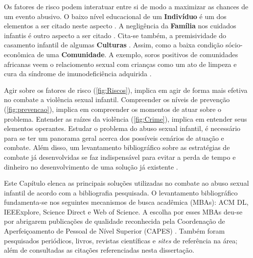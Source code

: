 Os fatores de risco podem interatuar entre si de modo a maximizar as chances de um evento abusivo. O baixo nível educacional de um \textbf{Indivíduo} é um dos elementos a ser citado neste aspecto \cite{dahlberg2006violencia}. A negligência da \textbf{Família} nos cuidados infantis é outro aspecto a ser citado \cite{blasco2018abuso}. Cita-se também, a premisividade do casamento infantil de algumas \textbf{Culturas} \cite{bandiera2017women}. Assim, como a baixa condição sócio-econômica de uma \textbf{Comunidade}. A exemplo, soros positivos de comunidades africanas veem o relaciomento sexual com crianças como um ato de limpeza e cura da síndrome de imunodeficiência adquirida \cite{aded2006abuso}.



Agir sobre os fatores de risco (\autoref{fig:Riscos}), implica em agir de forma mais efetiva no combate a violência sexual infantil. Compreender os níveis de prevenção (\autoref{fig:prevencao}), implica em compreender os momentos de atuar sobre o problema. Entender as raízes da violência (\autoref{fig:Crime}), implica em entender seus elementos operantes. Estudar o problema do abuso sexual infantil, é necessário para se ter um panorama geral acerca dos possíveis cenários de atuação e combate. Além disso, um levantamento bibliográfico sobre as estratégias de combate já desenvolvidas se faz indispensável para evitar a perda de tempo e dinheiro no desenvolvimento de uma solução já existente \cite{wazlawick2014metodologia}. 

Este Capítulo elenca as principais soluções utilizadas no combate ao abuso sexual infantil de acordo com a bibliografia pesquisada. O levantamento bibliográfico fundamenta-se nos seguintes mecanismos de busca acadêmica (MBAs): ACM DL, IEEExplore, Science Direct e Web of Science. A escolha por esses MBAs deu-se por abrigarem publicações de qualidade reconhecida pela Coordenação de Aperfeiçoamento de Pessoal de Nível Superior (CAPES) \cite{capes2016}%
. Também foram pesquisados periódicos, livros, revistas científicas e \textit{sites} de referência na área; além de consultadas as citações referenciadas nesta dissertação. 

